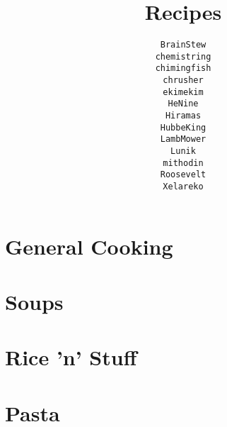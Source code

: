 \documentclass[12pt,a4paper,twoside]{book}
\title{Recipes}
\author{\texttt{BrainStew}\\%
		\texttt{chemistring}\\%
		\texttt{chimingfish}\\%
		\texttt{chrusher}\\%
		\texttt{ekimekim}\\%
		\texttt{HeNine}\\%
		\texttt{Hiramas}\\%
		\texttt{HubbeKing}\\%
		\texttt{LambMower}\\%
		\texttt{Lunik}\\%
		\texttt{mithodin}\\%
		\texttt{Roosevelt}\\%
		\texttt{Xelareko}
}
\begin{document}
	\maketitle
	\tableofcontents
	\clearpage

	\chapter{General Cooking}
	\clearpage

	
	\clearpage
	
	\clearpage
	
	\clearpage

	
	\clearpage
	
	\clearpage
	
	\clearpage
	
	\clearpage
	
	\clearpage

	
    \clearpage
    
    \clearpage
    

	\chapter{Soups}
	\clearpage

	
	\clearpage
	
	\clearpage
	
	\clearpage
	
	\clearpage
	
	\clearpage
	

	\chapter{Rice 'n' Stuff}
	\clearpage

	
	\clearpage
	
	\clearpage
	
	\clearpage
	
	\clearpage
	
	\clearpage
	

	\chapter{Pasta}
	\clearpage

	
	\clearpage
	
	\clearpage
	
	\clearpage
	
\end{document}
